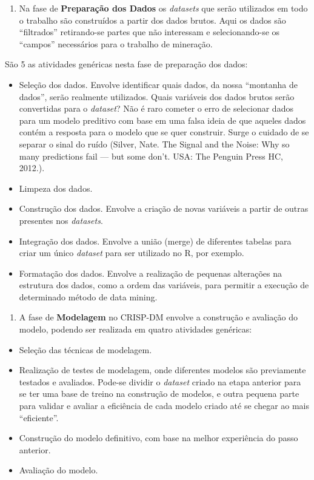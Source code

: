 \documentclass[]{article}
\providecommand{\tightlist}{%
  \setlength{\itemsep}{0pt}\setlength{\parskip}{0pt}}
\begin{document}
\begin{enumerate}
\def\labelenumi{\arabic{enumi}.}
\setcounter{enumi}{2}
\tightlist
\item
  Na fase de \textbf{Preparação dos Dados} os \emph{datasets} que serão
  utilizados em todo o trabalho são construídos a partir dos dados
  brutos. Aqui os dados são ``filtrados'' retirando-se partes que não
  interessam e selecionando-se os ``campos'' necessários para o trabalho
  de mineração.
\end{enumerate}

São 5 as atividades genéricas nesta fase de preparação dos dados:

\begin{itemize}
\item
  Seleção dos dados. Envolve identificar quais dados, da nossa
  ``montanha de dados'', serão realmente utilizados. Quais variáveis dos
  dados brutos serão convertidas para o \emph{dataset}? Não é raro
  cometer o erro de selecionar dados para um modelo preditivo com base
  em uma falsa ideia de que aqueles dados contém a resposta para o
  modelo que se quer construir. Surge o cuidado de se separar o sinal do
  ruído (Silver, Nate. The Signal and the Noise: Why so many predictions
  fail --- but some don't. USA: The Penguin Press HC, 2012.).
\item
  Limpeza dos dados.
\item
  Construção dos dados. Envolve a criação de novas variáveis a partir de
  outras presentes nos \emph{datasets}.
\item
  Integração dos dados. Envolve a união (merge) de diferentes tabelas
  para criar um único \emph{dataset} para ser utilizado no R, por
  exemplo.
\item
  Formatação dos dados. Envolve a realização de pequenas alterações na
  estrutura dos dados, como a ordem das variáveis, para permitir a
  execução de determinado método de data mining.
\end{itemize}

\begin{enumerate}
\def\labelenumi{\arabic{enumi}.}
\setcounter{enumi}{3}
\tightlist
\item
  A fase de \textbf{Modelagem} no CRISP-DM envolve a construção e
  avaliação do modelo, podendo ser realizada em quatro atividades
  genéricas:
\end{enumerate}

\begin{itemize}
\item
  Seleção das técnicas de modelagem.
\item
  Realização de testes de modelagem, onde diferentes modelos são
  previamente testados e avaliados. Pode-se dividir o \emph{dataset}
  criado na etapa anterior para se ter uma base de treino na construção
  de modelos, e outra pequena parte para validar e avaliar a eficiência
  de cada modelo criado até se chegar ao mais ``eficiente''.
\item
  Construção do modelo definitivo, com base na melhor experiência do
  passo anterior.
\item
  Avaliação do modelo.
\end{itemize}
\end{document}
